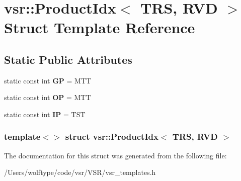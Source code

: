 \hypertarget{structvsr_1_1_product_idx_3_01_t_r_s_00_01_r_v_d_01_4}{\section{vsr\-:\-:Product\-Idx$<$ T\-R\-S, R\-V\-D $>$ Struct Template Reference}
\label{structvsr_1_1_product_idx_3_01_t_r_s_00_01_r_v_d_01_4}
}
\subsection*{Static Public Attributes}
\begin{DoxyCompactItemize}
\item 
\hypertarget{structvsr_1_1_product_idx_3_01_t_r_s_00_01_r_v_d_01_4_a04462369c8d3c063244c882199c166ae}{static const int {\bfseries G\-P} = M\-T\-T}\label{structvsr_1_1_product_idx_3_01_t_r_s_00_01_r_v_d_01_4_a04462369c8d3c063244c882199c166ae}

\item 
\hypertarget{structvsr_1_1_product_idx_3_01_t_r_s_00_01_r_v_d_01_4_a1e5c69ef0ab7df40d2bdab2ffd6a2e6e}{static const int {\bfseries O\-P} = M\-T\-T}\label{structvsr_1_1_product_idx_3_01_t_r_s_00_01_r_v_d_01_4_a1e5c69ef0ab7df40d2bdab2ffd6a2e6e}

\item 
\hypertarget{structvsr_1_1_product_idx_3_01_t_r_s_00_01_r_v_d_01_4_a5b3ef936963349ea68cfdc7338dccc34}{static const int {\bfseries I\-P} = T\-S\-T}\label{structvsr_1_1_product_idx_3_01_t_r_s_00_01_r_v_d_01_4_a5b3ef936963349ea68cfdc7338dccc34}

\end{DoxyCompactItemize}
\subsubsection*{template$<$$>$ struct vsr\-::\-Product\-Idx$<$ T\-R\-S, R\-V\-D $>$}



The documentation for this struct was generated from the following file\-:\begin{DoxyCompactItemize}
\item 
/\-Users/wolftype/code/vsr/\-V\-S\-R/vsr\-\_\-templates.\-h\end{DoxyCompactItemize}
